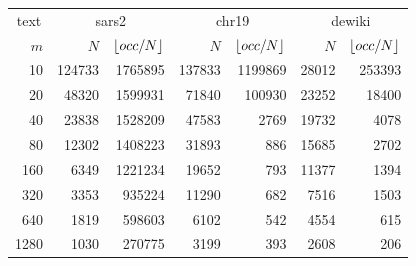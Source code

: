 
\begin{table}[p]
\centering

\vspace*{\fill}
\begin{minipage}[c]{0.49\textwidth}
\centering
\scriptsize
\setlength{\tabcolsep}{3pt}
\renewcommand{\arraystretch}{1.18}
\begin{tabular}{|r|rr|rr|rr|}
\hline
\multicolumn{1}{|c|}{text}
& \multicolumn{2}{c|}{sars2}
& \multicolumn{2}{c|}{chr19}
& \multicolumn{2}{c|}{dewiki} \\
$m$
& $N$ & $\lfloor occ/N \rfloor$
& $N$ & $\lfloor occ/N \rfloor$
& $N$ & $\lfloor occ/N \rfloor$ \\
\hline
  10 & 124733 & 1765895 & 137833 & 1199869 & 28012 & 253393 \\
  20 &  48320 & 1599931 &  71840 &  100930 & 23252 &  18400 \\
  40 &  23838 & 1528209 &  47583 &    2769 & 19732 &   4078 \\
  80 &  12302 & 1408223 &  31893 &     886 & 15685 &   2702 \\
 160 &   6349 & 1221234 &  19652 &     793 & 11377 &   1394 \\
 320 &   3353 &  935224 &  11290 &     682 &  7516 &   1503 \\
 640 &   1819 &  598603 &   6102 &     542 &  4554 &    615 \\
1280 &   1030 &  270775 &   3199 &     393 &  2608 &    206 \\
\hline
\end{tabular}
\label{tab:patterns_count}


\end{minipage}
\end{table}
